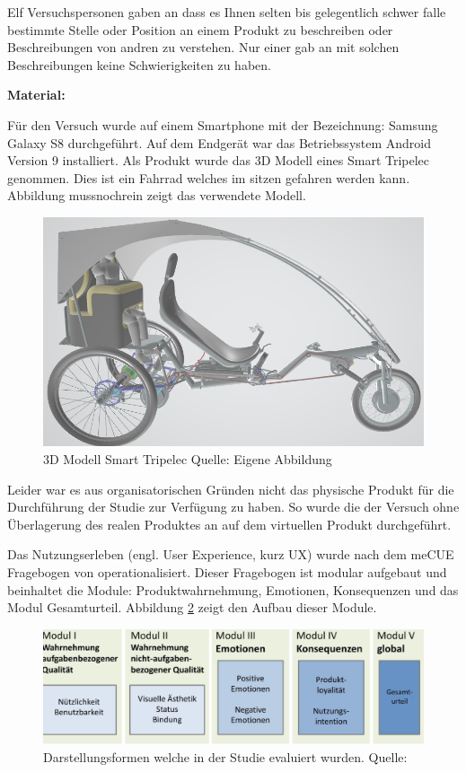 Elf Versuchspersonen gaben an dass es Ihnen selten bis gelegentlich schwer falle  bestimmte Stelle oder Position an einem Produkt zu beschreiben oder Beschreibungen von andren zu verstehen. Nur einer gab an mit 
solchen Beschreibungen keine Schwierigkeiten zu haben. 

\textbf{Material: }

Für den Versuch wurde auf einem Smartphone mit der Bezeichnung: Samsung Galaxy S8 durchgeführt. Auf dem Endgerät war das Betriebssystem Android Version 9 installiert. 
Als Produkt wurde das 3D Modell eines Smart Tripelec genommen. Dies ist ein Fahrrad welches im sitzen gefahren werden kann. Abbildung mussnochrein zeigt das verwendete Modell.

\begin{figure}[H]
	\centering 
	\includegraphics[width=.6\textwidth]{resources/evaluation/SmartTripelec.png}
	\caption{3D Modell Smart Tripelec Quelle: Eigene Abbildung}
	\label{img:mequeMoudul}
\end{figure}

Leider war es aus organisatorischen Gründen nicht das physische Produkt für die Durchführung der Studie zur Verfügung zu haben. So wurde die der Versuch ohne Überlagerung des realen Produktes
an auf dem virtuellen Produkt durchgeführt. 

Das Nutzungserleben (engl. User Experience, kurz UX) wurde nach dem meCUE Fragebogen von \citeauthor{Minge2013} operationalisiert. Dieser Fragebogen ist modular aufgebaut und beinhaltet die Module: 
Produktwahrnehmung, Emotionen, Konsequenzen und das Modul Gesamturteil. Abbildung \ref{img:mequeMoudul} zeigt den Aufbau dieser Module.

\begin{figure}[H]
	\centering 
	\includegraphics[width=.6\textwidth]{resources/evaluation/meQueModul.png}
	\caption{Darstellungsformen welche in der Studie evaluiert wurden. Quelle: \cite[S.~4]{Minge2013}}
	\label{img:mequeMoudul}
\end{figure} 

